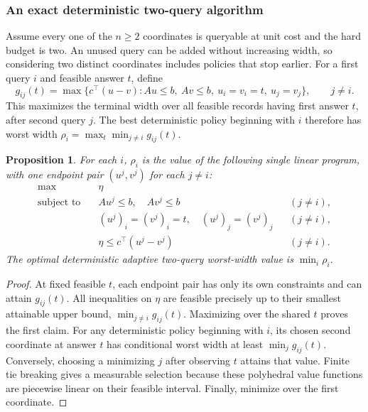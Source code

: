 \documentclass[12pt]{article}
\newtheorem{proposition}{Proposition}
\begin{document}
\subsubsection{An exact deterministic two-query algorithm}\label{sec:two-query}
Assume every one of the $n\ge2$ coordinates is queryable at unit cost and the
hard budget is two. An unused query can be added without increasing width,
so considering two distinct coordinates includes policies that stop earlier.
For a first query $i$ and feasible answer $t$, define
\begin{equation}\label{eq:conditional-two-query}
g_{ij}(t)=\max\{c^\top(u-v):Au\le b,\ Av\le b,\
                u_i=v_i=t,\ u_j=v_j\},\qquad j\ne i.
\end{equation}
This maximizes the terminal width over all feasible records having first
answer $t$, after second query $j$. The best deterministic policy beginning
with $i$ therefore has worst width
$\rho_i=\max_t\min_{j\ne i}g_{ij}(t)$.

\begin{proposition}\label{prop:two-query-lp}
For each $i$, $\rho_i$ is the value of the following single linear program,
with one endpoint pair $(u^j,v^j)$ for each $j\ne i$:
\begin{equation}\label{eq:two-query-lp}
\begin{aligned}
\max\quad &\eta\\
\text{subject to}\quad &Au^j\le b,\quad Av^j\le b &&(j\ne i),\\
&(u^j)_i=(v^j)_i=t,\quad (u^j)_j=(v^j)_j &&(j\ne i),\\
&\eta\le c^\top(u^j-v^j) &&(j\ne i).
\end{aligned}
\end{equation}
The optimal deterministic adaptive two-query worst-width value is
$\min_i\rho_i$.
\end{proposition}
\begin{proof}
At fixed feasible $t$, each endpoint pair has only its own constraints and
can attain $g_{ij}(t)$. All inequalities on $\eta$ are feasible precisely up
to their smallest attainable upper bound, $\min_{j\ne i}g_{ij}(t)$.
Maximizing over the shared $t$ proves the first claim.
For any deterministic policy beginning with $i$, its chosen second coordinate
at answer $t$ has conditional worst width at least $\min_jg_{ij}(t)$.
Conversely, choosing a minimizing $j$ after observing $t$ attains that value.
Finite tie breaking gives a measurable selection because these polyhedral
value functions are piecewise linear on their feasible interval. Finally,
minimize over the first coordinate.
\end{proof}
\end{document}
